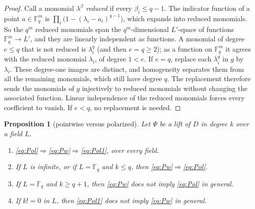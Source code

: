 \documentclass[11pt]{amsart}
\newtheorem{proposition}[theorem]{Proposition}
\theoremstyle{definition}
\theoremstyle{remark}
\numberwithin{equation}{section}
\newcommand{\F}{\mathbb F}
\begin{document}
\begin{proof}
Call a monomial $\lambda^\beta$ \emph{reduced} if every $\beta_i\le q-1$. The indicator function of a point
$a\in\F_q^m$ is $\prod_i\bigl(1-(\lambda_i-a_i)^{q-1}\bigr)$, which expands into reduced monomials. So the $q^m$ reduced
monomials span the $q^m$\nobreakdash-dimensional $L'$\nobreakdash-space of functions $\F_q^m\to L'$, and they are linearly independent as
functions. A monomial of degree $e\le q$ that is not reduced is $\lambda_i^q$ (and then $e=q\ge2$); as a function on
$\F_q^m$ it agrees with the reduced monomial $\lambda_i$, of degree $1<e$. If $e=q$, replace each $\lambda_i^q$ in $g$ by
$\lambda_i$. These degree-one images are distinct, and homogeneity separates them from all the remaining monomials,
which still have degree $q$. The replacement therefore sends the monomials of $g$ injectively to reduced monomials
without changing the associated function. Linear independence of the reduced monomials forces every coefficient to
vanish. If $e<q$, no replacement is needed.
\end{proof}

\begin{proposition}[pointwise versus polarized]\label{prop:diag}
Let $\Psi$ be a lift of $D$ in degree $k$ over a field $L$.
\begin{enumerate}
\item \eqref{eq:Pol}$\Rightarrow$\eqref{eq:Pw}$\Rightarrow$\eqref{eq:Pol1}, over every field.
\item If $L$ is infinite, or if $L=\F_q$ and $k\le q$, then \eqref{eq:Pw}$\Rightarrow$\eqref{eq:Pol}.
\item If $L=\F_q$ and $k\ge q+1$, then \eqref{eq:Pw} does not imply \eqref{eq:Pol} in general.
\item If $k!=0$ in $L$, then \eqref{eq:Pol1} does not imply \eqref{eq:Pw} in general.
\end{enumerate}
\end{proposition}
\end{document}
